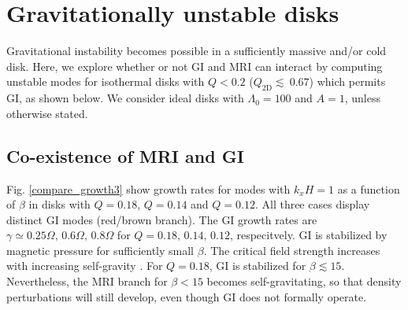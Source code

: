 \section{Gravitationally unstable disks} \label{result2}
Gravitational instability becomes possible in a sufficiently
massive and/or cold disk. Here, we explore whether or not GI and MRI
can interact by computing unstable modes for isothermal disks with $Q < 0.2 $
($Q_\mathrm{2D}\lesssim ~0.67$) which permits GI, as shown below.
We consider ideal disks with $\Lambda_0=100$ and $A=1$, unless
otherwise stated.  

\subsection{Co-existence of MRI and GI} 
Fig. \ref{compare_growth3} show growth rates for modes with $k_xH=1$
as a function of $\beta$ in disks with $Q=0.18$, $Q=0.14$ and
$Q=0.12$.   
All three cases display distinct GI modes (red/brown branch). The GI 
growth rates are $\gamma\simeq 0.25\Omega,\,0.6\Omega,\,0.8\Omega$ for
$Q=0.18,\,0.14,\,0.12$, respecitvely. GI is stabilized by magnetic
pressure for sufficiently small $\beta$. The critical
field strength increases with increasing self-gravity \citep{nakamura83}. 
For $Q=0.18$, GI is stabilized for $\beta \lesssim 15$. Nevertheless, 
the MRI branch for $\beta < 15$ becomes self-gravitating, so that
density perturbations will still develop, even though GI does not
formally operate.  


